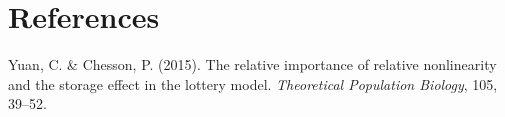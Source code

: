 \documentclass[11pt,]{article}
\begin{document}
\newpage{}

\section*{References}\label{references}

\hypertarget{refs}{}
\hypertarget{ref-Yuan2015}{}
Yuan, C. \& Chesson, P. (2015). The relative importance of relative
nonlinearity and the storage effect in the lottery model.
\emph{Theoretical Population Biology}, 105, 39--52.
\end{document}
